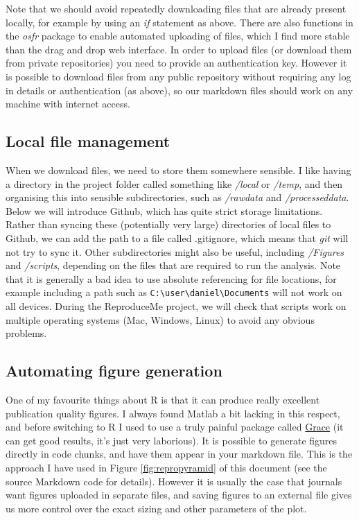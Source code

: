\documentclass[
]{article}
\begin{document}
Note that we should avoid repeatedly downloading files that are already present locally, for example by using an \emph{if} statement as above. There are also functions in the \emph{osfr} package to enable automated uploading of files, which I find more stable than the drag and drop web interface. In order to upload files (or download them from private repositories) you need to provide an authentication key. However it is possible to download files from any public repository without requiring any log in details or authentication (as above), so our markdown files should work on any machine with internet access.

\hypertarget{local-file-management}{%
\subsection{Local file management}\label{local-file-management}}

When we download files, we need to store them somewhere sensible. I like having a directory in the project folder called something like \emph{/local} or \emph{/temp}, and then organising this into sensible subdirectories, such as \emph{/rawdata} and \emph{/processeddata}. Below we will introduce Github, which has quite strict storage limitations. Rather than syncing these (potentially very large) directories of local files to Github, we can add the path to a file called .gitignore, which means that \emph{git} will not try to sync it. Other subdirectories might also be useful, including \emph{/Figures} and \emph{/scripts}, depending on the files that are required to run the analysis. Note that it is generally a bad idea to use absolute referencing for file locations, for example including a path such as \texttt{C:\textbackslash{}user\textbackslash{}daniel\textbackslash{}Documents} will not work on all devices. During the ReproduceMe project, we will check that scripts work on multiple operating systems (Mac, Windows, Linux) to avoid any obvious problems.

\hypertarget{automating-figure-generation}{%
\subsection{Automating figure generation}\label{automating-figure-generation}}

One of my favourite things about R is that it can produce really excellent publication quality figures. I always found Matlab a bit lacking in this respect, and before switching to R I used to use a truly painful package called \href{https://plasma-gate.weizmann.ac.il/Grace/}{Grace} (it can get good results, it's just very laborious). It is possible to generate figures directly in code chunks, and have them appear in your markdown file. This is the approach I have used in Figure \ref{fig:repropyramid} of this document (see the source Markdown code for details). However it is usually the case that journals want figures uploaded in separate files, and saving figures to an external file gives us more control over the exact sizing and other parameters of the plot.
\end{document}
